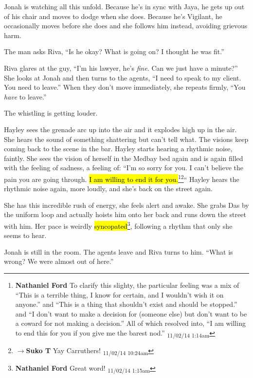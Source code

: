 Jonah is watching all this unfold.  Because he's in sync with Jaya, he gets up out of his chair and moves to dodge when she does.  Because he's Vigilant, he occasionally moves before she does and she follows him instead, avoiding grievous harm.

The man asks Riva, ``Is he okay?  What is going on?  I thought he was fit.''

Riva glares at the guy, ``I'm his lawyer, he's \textit{fine}.  Can we just have a minute?''  She looks at Jonah and then turns to the agents, ``I need to speak to my client.  You need to leave.''  When they don't move immediately, she repeats firmly, ``You \textit{have }to leave.''

The whistling is getting louder.



Hayley sees the grenade arc up into the air and it explodes high up in the air.  She hears the sound of something shattering but can't tell what.  The visions keep coming back to the scene in the bar.  Hayley starts hearing a rhythmic noise, faintly.  She sees the vision of herself in the Medbay bed again and is again filled with the feeling of sadness, a feeling of: ``I'm so sorry for you. I can't believe the pain you are going through. \hl{I am willing to end it for you.}\footnote{\textbf{Nathaniel Ford }To clarify this slighty, the particular feeling was a mix of ``This is a terrible thing, I know for certain, and I wouldn't wish it on anyone.'' and ``This is a thing that shouldn't exist and should be stopped.'' and ``I don't want to make a decision for (someone else) but don't want to be a coward for not making a decision.'' All of which resolved into, ``I am willing to end this for you if you give me the barest nod.'' \textsubscript{11/02/14 1:14am}}\footnote{$\rightarrow$\textbf{Suko T }Yay Carruthers! \textsubscript{11/02/14 10:24am}}``  Hayley hears the rhythmic noise again, more loudly, and she's back on the street again.

She has this incredible rush of energy, she feels alert and awake.  She grabs Das by the uniform loop and actually hoists him onto her back and runs down the street with him.  Her pace is weirdly \hl{syncopated}\footnote{\textbf{Nathaniel Ford }Great word! \textsubscript{11/02/14 1:15am}}, following a rhythm that only she seems to hear.



Jonah is still in the room.  The agents leave and Riva turns to him.  ``What is wrong?  We were almost out of here.''

